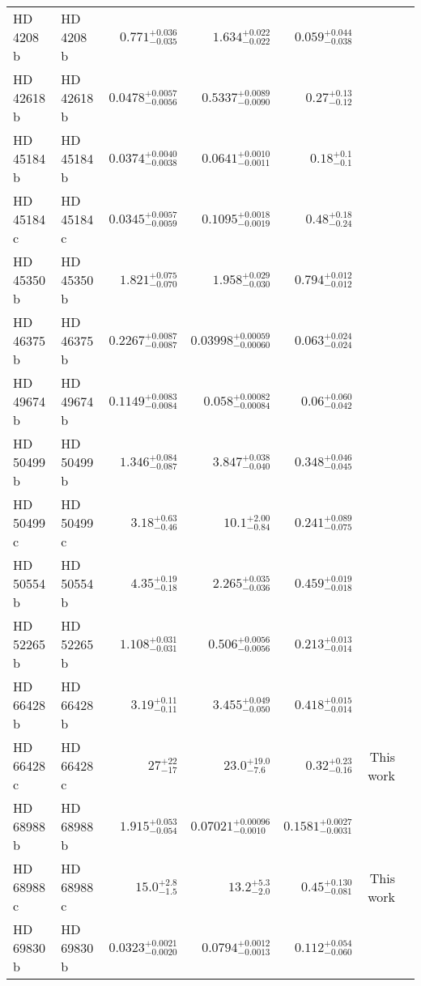 \begin{longtable*}{llrrrrr}
HD 4208 b & HD 4208 b & $0.771^{+0.036}_{-0.035}$ & $1.634^{+0.022}_{-0.022}$ & $0.059^{+0.044}_{-0.038}$ & \cite{Vogt02} & \\
HD 42618 b & HD 42618 b & $0.0478^{+0.0057}_{-0.0056}$ & $0.5337^{+0.0089}_{-0.0090}$ & $0.27^{+0.13}_{-0.12}$ & \cite{Fulton16} & \\
HD 45184 b & HD 45184 b & $0.0374^{+0.0040}_{-0.0038}$ & $0.0641^{+0.0010}_{-0.0011}$ & $0.18^{+0.1}_{-0.1}$ & \cite{Mayor11} & \\
HD 45184 c & HD 45184 c & $0.0345^{+0.0057}_{-0.0059}$ & $0.1095^{+0.0018}_{-0.0019}$ & $0.48^{+0.18}_{-0.24}$ & \cite{Udry19} & \\
HD 45350 b & HD 45350 b & $1.821^{+0.075}_{-0.070}$ & $1.958^{+0.029}_{-0.030}$ & $0.794^{+0.012}_{-0.012}$ & \cite{Marcy05} & \\
HD 46375 b & HD 46375 b & $0.2267^{+0.0087}_{-0.0087}$ & $0.03998^{+0.00059}_{-0.00060}$ & $0.063^{+0.024}_{-0.024}$ & \cite{Marcy00} & \\
HD 49674 b & HD 49674 b & $0.1149^{+0.0083}_{-0.0084}$ & $0.058^{+0.00082}_{-0.00084}$ & $0.06^{+0.060}_{-0.042}$ & \cite{Butler03} & \\
HD 50499 b & HD 50499 b & $1.346^{+0.084}_{-0.087}$ & $3.847^{+0.038}_{-0.040}$ & $0.348^{+0.046}_{-0.045}$ & \cite{Vogt05} & \\
HD 50499 c & HD 50499 c & $3.18^{+0.63}_{-0.46}$ & $10.1^{+2.00}_{-0.84}$ & $0.241^{+0.089}_{-0.075}$ & \cite{Rickman19} & \\
HD 50554 b & HD 50554 b & $4.35^{+0.19}_{-0.18}$ & $2.265^{+0.035}_{-0.036}$ & $0.459^{+0.019}_{-0.018}$ & \cite{Fischer02} & \\
HD 52265 b & HD 52265 b & $1.108^{+0.031}_{-0.031}$ & $0.506^{+0.0056}_{-0.0056}$ & $0.213^{+0.013}_{-0.014}$ & \cite{Butler00} & \\
HD 66428 b & HD 66428 b & $3.19^{+0.11}_{-0.11}$ & $3.455^{+0.049}_{-0.050}$ & $0.418^{+0.015}_{-0.014}$ & \cite{Butler06} & \\
HD 66428 c & HD 66428 c & $27^{+22}_{-17}$ & $23.0^{+19.0}_{-7.6}$ & $0.32^{+0.23}_{-0.16}$ & This work & \\
HD 68988 b & HD 68988 b & $1.915^{+0.053}_{-0.054}$ & $0.07021^{+0.00096}_{-0.0010}$ & $0.1581^{+0.0027}_{-0.0031}$ & \cite{Vogt02} & \\
HD 68988 c & HD 68988 c & $15.0^{+2.8}_{-1.5}$ & $13.2^{+5.3}_{-2.0}$ & $0.45^{+0.130}_{-0.081}$ & This work & \\
HD 69830 b & HD 69830 b & $0.0323^{+0.0021}_{-0.0020}$ & $0.0794^{+0.0012}_{-0.0013}$ & $0.112^{+0.054}_{-0.060}$ & \cite{Lovis06} & \\

\end{longtable*}
